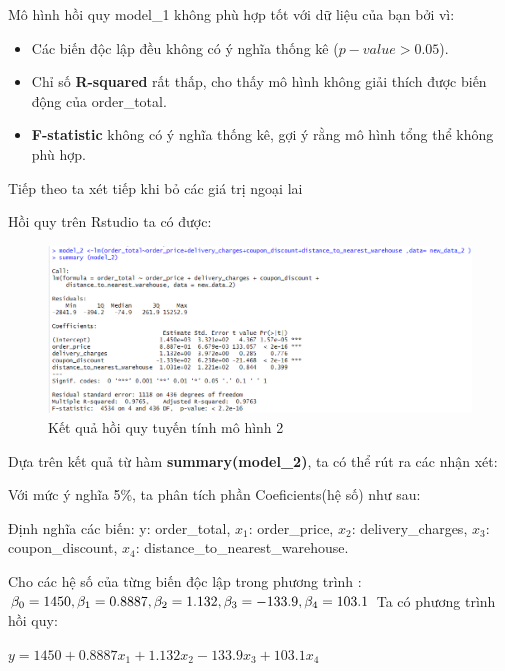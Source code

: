 Mô hình hồi quy model\_1 không phù hợp tốt với dữ liệu của bạn bởi vì:
\begin{itemize}
\item Các biến độc lập đều không có ý nghĩa thống kê ($p-value > 0.05$).
\item Chỉ số \textbf{R-squared} rất thấp, cho thấy mô hình không giải thích được biến động của order\_total.
\item\textbf{F-statistic} không có ý nghĩa thống kê, gợi ý rằng mô hình tổng thể không phù hợp.
\end{itemize}

Tiếp theo ta xét tiếp khi bỏ các giá trị ngoại lai

Hồi quy trên Rstudio ta có được:
\begin{figure}[H]
  \centering
  \includegraphics[width=0.7\linewidth]{graphics/5.5.3.png}
  \caption{Kết quả hồi quy tuyến tính mô hình 2 }
\end{figure} 

Dựa trên kết quả từ hàm \textbf{summary(model\_2)}, ta có thể rút ra các nhận xét:

Với mức ý nghĩa 5\%, ta phân tích phần Coeficients(hệ số) như sau:

Định nghĩa các biến:  y: order\_total, $x_1$: order\_price, $x_2$: delivery\_charges, $x_3$: coupon\_discount, $x_4$: distance\_to\_nearest\_warehouse.

Cho các hệ số của từng biến độc lập trong phương trình : $\beta_0= 1450, \beta_1= 0.8887, \\\beta_2= 1.132, \beta_3= -133.9, \beta_4= 103.1$ Ta có phương trình hồi quy: 

 \hspace{25mm}$y= 1450 + 0.8887x_1 + 1.132x_2 - 133.9x_3 + 103.1x_4$

